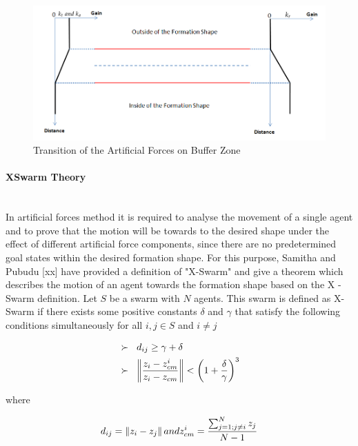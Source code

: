 \begin{figure}[H]
\caption{Transition of the Artificial Forces on Buffer Zone}
\centering
\includegraphics[scale = 0.50]{buffer_zone}
\end{figure}
			
			
\paragraph{XSwarm Theory}\hspace{0pt} \\
In artificial forces method it is required to analyse the movement of a single agent and to prove that the motion will be towards to the desired shape under the effect of different artificial force components, since there are no predetermined goal states within the desired formation shape. For this purpose, Samitha and Pubudu [xx] have provided a definition of "X-Swarm" and give a theorem which describes the motion of an agent towards the formation shape based on the X -Swarm definition. Let $S$ be a swarm with $N$ agents. This swarm is defined as X-Swarm if there exists some positive constants $\delta$ and  $ \gamma$ that satisfy the following conditions simultaneously for all $i,j \in S$ and $i \neq j$
			
\begin{align}
\begin{split}
&\succ\hspace{0.2cm}  d_{ij} \geq \gamma + \delta \\
&\succ \hspace{0.2cm}   \left\lVert\frac{z_i - z_{cm}^i}{z_i - z_{cm}}\right\rVert < \left(1+\frac{\delta}{\gamma}\right)^3
\end{split}
\end{align}

where

\begin{equation}
 d_{ij} = \left\lVert z_i - z_j\right\rVert and z_{cm}^i = \frac{\sum_{j=1; j\neq i}^{N} z_j}{N-1}
\end{equation}

